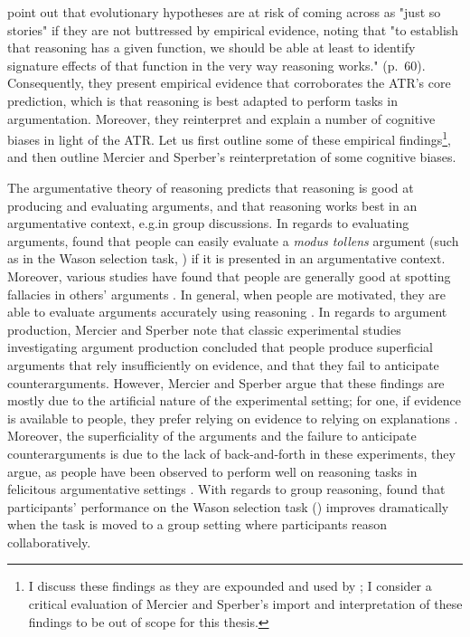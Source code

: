 \citet{MS11} point out that evolutionary hypotheses are at risk of coming across as "just so stories" if they are not buttressed by empirical evidence, noting that "to establish that reasoning has a given function, we should be able at least to identify signature effects of that function in the very way reasoning works." (p.~60).
Consequently, they present empirical evidence that corroborates the ATR's core prediction, which is that reasoning is best adapted to perform tasks in argumentation. Moreover, they reinterpret and explain a number of cognitive biases in light of the ATR.
Let us first outline some of these empirical findings\footnote{I discuss these findings as they are expounded and used by \citet{MS11}; I consider a critical evaluation of Mercier and Sperber's import and interpretation of these findings to be out of scope for this thesis.}, and then outline Mercier and Sperber's reinterpretation of some cognitive biases.

The argumentative theory of reasoning predicts that reasoning is good at producing and evaluating arguments, and that reasoning works best in an argumentative context, e.g.\@ in group discussions.
In regards to evaluating arguments, \citet{Thompson05} found that people can easily evaluate a \emph{modus tollens} argument (such as in the Wason selection task, \citeyear{Wason68}) if it is presented in an argumentative context.
Moreover, various studies have found that people are generally good at spotting fallacies in others' arguments \citep{Hahn07,Corner09,Oaksford04}.
In general, when people are motivated, they are able to evaluate arguments accurately using reasoning \citep{Petty98}.
In regards to argument production, Mercier and Sperber note that classic experimental studies investigating argument production \citep{Perkins85, Kuhn91} concluded that people produce superficial arguments that rely insufficiently on evidence, and that they fail to anticipate counterarguments.
However, Mercier and Sperber argue that these findings are mostly due to the artificial nature of the experimental setting; for one, if evidence is available to people, they prefer relying on evidence to relying on explanations \citep{Brem00}. Moreover, the superficiality of the arguments and the failure to anticipate counterarguments is due to the lack of back-and-forth in these experiments, they argue, as people have been observed to perform well on reasoning tasks in felicitous argumentative settings \citep{Resnick93}.
With regards to group reasoning, \citet{Moshman98} found that participants' performance on the Wason selection task (\citeyear{Wason68}) improves dramatically when the task is moved to a group setting where participants reason collaboratively.

